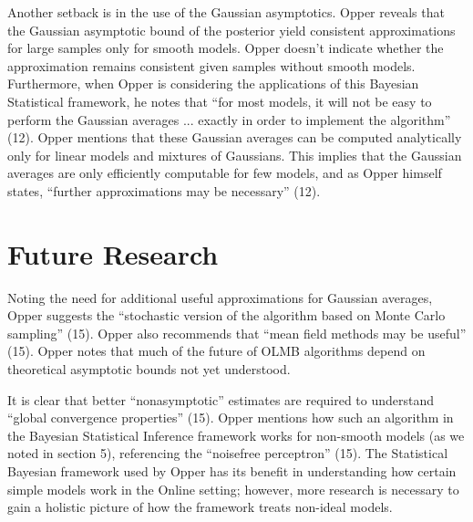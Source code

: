 																																																																																																																																																																																																																															     \noindent Another setback is in the use of the Gaussian asymptotics. Opper reveals that the Gaussian asymptotic bound of the posterior yield consistent approximations for large samples only for smooth models. Opper doesn't indicate whether the approximation remains consistent given samples without smooth models. Furthermore, when Opper is considering the applications of this Bayesian Statistical framework, he notes that ``for most models, it will not be easy to perform the Gaussian averages ... exactly in order to implement the algorithm'' (12). Opper mentions that these Gaussian averages can be computed analytically only for linear models and mixtures of Gaussians. This implies that the Gaussian averages are only efficiently computable for few models, and as Opper himself states, ``further approximations may be necessary'' (12). 

																																																																																																																																																																																																																																 \section{Future Research}
																																																																																																																																																																																																																																     Noting the need for additional useful approximations for Gaussian averages, Opper suggests the ``stochastic version of the algorithm based on Monte Carlo sampling'' (15). Opper also recommends that ``mean field methods may be useful'' (15). Opper notes that much of the future of OLMB algorithms depend on theoretical asymptotic bounds not yet understood. \vspace{4mm}
																																																																																																																																																																																																																																	     
																																																																																																																																																																																																																																		     \noindent It is clear that better ``nonasymptotic'' estimates are required to understand ``global convergence properties'' (15). Opper mentions how such an algorithm in the Bayesian Statistical Inference framework works for non-smooth models (as we noted in section 5), referencing the ``noisefree perceptron'' (15). The Statistical Bayesian framework used by Opper has its benefit in understanding how certain simple models work in the Online setting; however, more research is necessary to gain a holistic picture of how the framework treats non-ideal models.

